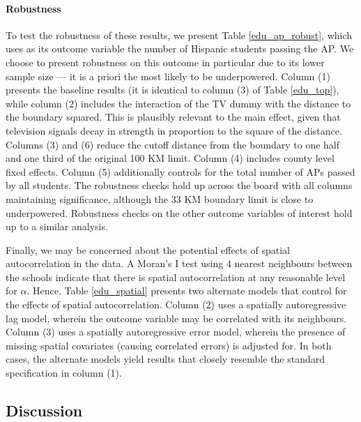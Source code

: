 \documentclass[11pt]{article}
\begin{document}
\paragraph{Robustness} To test the robustness of these results, we present Table \ref{edu_ap_robust}, which uses as its outcome variable the number of Hispanic students passing the AP. We choose to present robustness on this outcome in particular due to its lower sample size --- it is a priori the most likely to be underpowered. Column (1) presents the baseline results (it is identical to column (3) of Table \ref{edu_top}), while column (2) includes the interaction of the TV dummy with the distance to the boundary squared. This is plausibly relevant to the main effect, given that television signals decay in strength in proportion to the square of the distance. Columns (3) and (6) reduce the cutoff distance from the boundary to one half and one third of the original 100 KM limit. Column (4) includes county level fixed effects. Column (5) additionally controls for the total number of APs passed by all students. The robustness checks hold up across the board with all columns maintaining significance, although the 33 KM boundary limit is close to underpowered. Robustness checks on the other outcome variables of interest hold up to a similar analysis.

Finally, we may be concerned about the potential effects of spatial autocorrelation in the data. A Moran's I test using 4 nearest neighbours between the schools indicate that there is spatial autocorrelation at any reasonable level for $\alpha$. Hence, Table \ref{edu_spatial} presents two alternate models that control for the effects of spatial autocorrelation. Column (2) uses a spatially autoregressive lag model, wherein the outcome variable may be correlated with its neighbours. Column (3) uses a spatially autoregressive error model, wherein the presence of missing spatial covariates (causing correlated errors) is adjusted for. In both cases, the alternate models yield results that closely resemble the standard specification in column (1). 


\subsection{Discussion}
\end{document}
